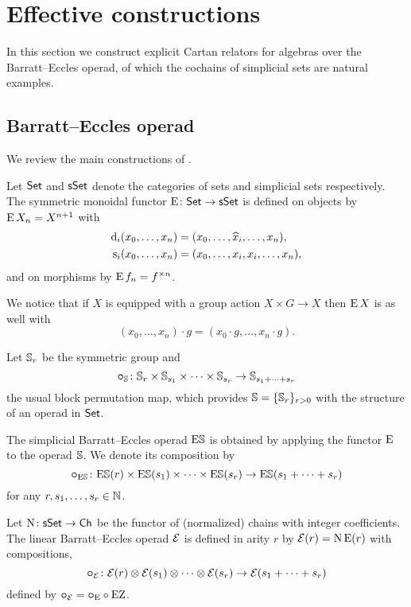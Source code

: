 
\section{Effective constructions}

In this section we construct explicit Cartan relators for algebras over the Barratt--Eccles operad, of which the cochains of simplicial sets are natural examples.

\subsection{Barratt--Eccles operad}

We review the main constructions of \cite{berger2004combinatorial}.

\sssec

Let $\mathsf{Set}$ and $\mathsf{sSet}$ denote the categories of sets and simplicial sets respectively.
The symmetric monoidal functor $\operatorname{E} \colon \mathsf{Set} \to \mathsf{sSet}$ is defined on objects by $\operatorname{E} X_n = X^{n+1}$ with
\[
\begin{split}
	\operatorname{d}_i(x_0,\dots,x_n) &= (x_0,\dots,\widehat{x}_i,\dots,x_n), \\
	\operatorname{s}_i(x_0,\dots,x_n) &= (x_0, \dots, x_i, x_i, \dots, x_n),
\end{split}
\]
and on morphisms by $\operatorname{E} f_n = f^{\times n}$.

We notice that if $X$ is equipped with a group action $X \times G \to X$ then $\operatorname{E} X$ is as well with
\[
(x_0,\dots,x_n) \cdot g = (x_0 \cdot g, \dots, x_n \cdot g).
\]

\sssec

Let $\mathbb{S}_r$ be the symmetric group and
\[
\bm{\circ}_{\mathbb{S}} \colon \mathbb{S}_r \times \mathbb{S}_{s_1} \times \cdots \times \mathbb{S}_{s_r} \to \mathbb{S}_{s_1+\dots+s_r}
\]
the usual block permutation map, which provides $\mathbb{S} = \{\mathbb{S}_r\}_{r>0}$ with the structure of an operad in $\mathsf{Set}$.

\sssec

The simplicial Barratt--Eccles operad $\mathrm{E}\mathbb{S}$ is obtained by applying the functor $\operatorname{E}$ to the operad $\mathbb{S}$.
We denote its composition by
\[
\bm{\circ}_{\mathrm{E}\mathbb{S}} \colon \mathrm{E}\mathbb{S}(r) \times \mathrm{E}\mathbb{S}(s_1) \times\dots\times \mathrm{E}\mathbb{S}(s_r) \to \mathrm{E}\mathbb{S}(s_1+\dots+s_r)
\]
for any $r,s_1,\dots,s_r \in \mathbb{N}$.

\sssec

Let $\operatorname{N} \colon \mathsf{sSet} \to \mathsf{Ch}$ be the functor of (normalized) chains with integer coefficients.
The linear Barratt--Eccles operad $\mathcal{E}$ is defined in arity $r$ by $\mathcal{E}(r) = \operatorname{N}\operatorname{E}(r)$ with compositions,
\[
\bm{\circ}_{\mathcal{E}} \colon \mathcal{E}(r) \otimes \mathcal{E}(s_1) \otimes\dotsb\otimes \mathcal{E}(s_r) \to \mathcal{E}(s_1+\dots+s_r)
\]
defined by $\bm{\circ}_{\mathcal{E}} = \bm{\circ}_{\operatorname{E}} \circ \operatorname{EZ}$.

